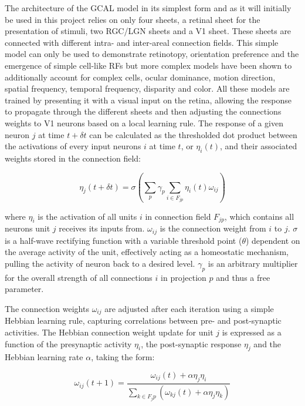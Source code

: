 The architecture of the GCAL model in its simplest form and as it will
initially be used in this project relies on only four sheets, a
retinal sheet for the presentation of stimuli, two RGC/LGN sheets and
a V1 sheet. These sheets are connected with different intra- and
inter-areal connection fields. This simple model can only be used to
demonstrate retinotopy, orientation preference and the emergence of
simple cell-like RFs but more complex models have been shown to
additionally account for complex cells, ocular dominance, motion
direction, spatial frequency, temporal frequency, disparity and
color. All these models are trained by presenting it with a visual
input on the retina, allowing the response to propagate through the
different sheets and then adjusting the connections weights to V1
neurons based on a local learning rule. The response of a given neuron
$j$ at time $t+\delta t$ can be calculated as the thresholded dot
product between the activations of every input neurons $i$ at time
$t$, or $\eta_i(t)$, and their associated weights stored in the
connection field:

\begin{equation}
\eta_j(t+\delta t) = \sigma \left ( \sum_p{\gamma_p} \sum_{i \in
  F_{jp}}{\eta_i(t)\omega_{ij}}\right)
\end{equation}

where $\eta_i$ is the activation of all units $i$ in connection field
$F_{jp}$, which contains all neurons unit $j$ receives its inputs
from. $\omega_{ij}$ is the connection weight from $i$ to $j$. $\sigma$
is a half-wave rectifying function with a variable threshold point
($\theta$) dependent on the average activity of the unit, effectively
acting as a homeostatic mechanism, pulling the activity of neuron back
to a desired level. $\gamma_p$ is an arbitrary multiplier for the
overall strength of all connections $i$ in projection $p$ and thus a
free parameter.

The connection weights $\omega_{ij}$ are adjusted after each iteration
using a simple Hebbian learning rule, capturing correlations between
pre- and post-synaptic activities. The Hebbian connection weight
update for unit $j$ is expressed as a function of the presynaptic
activity $\eta_i$, the post-synaptic response $\eta_j$ and the Hebbian
learning rate $\alpha$, taking the form:

\begin{equation}
\omega_{ij}(t+1) = \frac{\omega_{ij}(t) + \alpha \eta_j
  \eta_i}{\sum_{k\in F_jp}{ (\omega_{kj}(t) + \alpha \eta_j \eta_k)}}
\end{equation}

